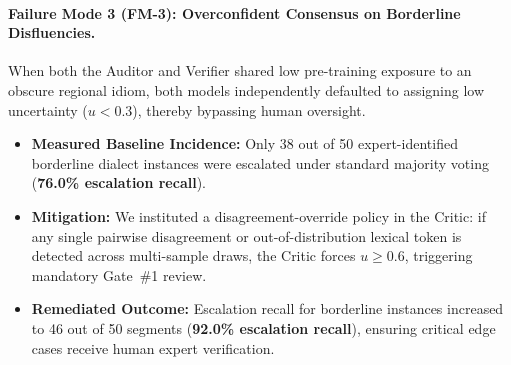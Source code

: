 \paragraph{Failure Mode 3 (FM-3): Overconfident Consensus on Borderline Disfluencies.}
When both the Auditor and Verifier shared low pre-training exposure to an obscure regional idiom, both models independently defaulted to assigning low uncertainty ($u < 0.3$), thereby bypassing human oversight.
\begin{itemize}
    \item \textbf{Measured Baseline Incidence:} Only 38 out of 50 expert-identified borderline dialect instances were escalated under standard majority voting (\textbf{76.0\% escalation recall}).
    \item \textbf{Mitigation:} We instituted a disagreement-override policy in the Critic: if any single pairwise disagreement or out-of-distribution lexical token is detected across multi-sample draws, the Critic forces $u \ge 0.6$, triggering mandatory Gate~\#1 review.
    \item \textbf{Remediated Outcome:} Escalation recall for borderline instances increased to 46 out of 50 segments (\textbf{92.0\% escalation recall}), ensuring critical edge cases receive human expert verification.
\end{itemize}
